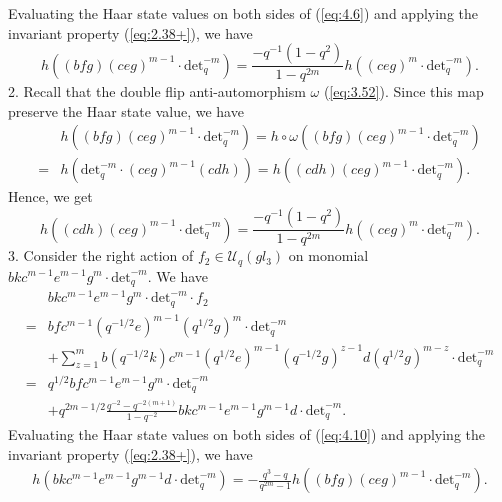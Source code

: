 \documentclass[table,a4paper,reqno]{amsart}
\numberwithin{equation}{section}
\theoremstyle{definition}
\begin{document}
Evaluating the Haar state values on both sides of (\ref{eq:4.6}) and applying the invariant property (\ref{eq:2.38+}), we have
\begin{equation}\label{eq:4.7}
    h((bfg)(ceg)^{m-1}\cdot\text{det}_q^{-m})=\frac{-q^{-1}(1-q^2)}{1-q^{2m}}h((ceg)^m\cdot\text{det}_q^{-m}).
\end{equation}
2. Recall that the double flip anti-automorphism $\omega$ (\ref{eq:3.52}). Since this map preserve the Haar state value, we have
\begin{equation}
\begin{split}
    &h((bfg)(ceg)^{m-1}\cdot\text{det}_q^{-m})=h\circ\omega((bfg)(ceg)^{m-1}\cdot\text{det}_q^{-m})\\
    =&h(\text{det}_q^{-m}\cdot(ceg)^{m-1}(cdh))=h((cdh)(ceg)^{m-1}\cdot\text{det}_q^{-m}).
\end{split}
\end{equation}
Hence, we get
\begin{equation}\label{eq:4.9}
    h((cdh)(ceg)^{m-1}\cdot\text{det}_q^{-m})=\frac{-q^{-1}(1-q^2)}{1-q^{2m}}h((ceg)^m\cdot\text{det}_q^{-m}).
\end{equation}
3. Consider the right action of $f_2\in\mathcal{U}_q(gl_3)$ on monomial $bkc^{m-1}e^{m-1}g^{m}\cdot\text{det}_q^{-m}$. We have 
\begin{equation}\label{eq:4.10}
    \begin{split}
        &bkc^{m-1}e^{m-1}g^{m}\cdot\text{det}_q^{-m}\cdot f_2\\
        =&bfc^{m-1}(q^{-1/2}e)^{m-1}(q^{1/2}g)^{m}\cdot\text{det}_q^{-m}\\
        &+\sum_{z=1}^mb(q^{-1/2}k)c^{m-1}(q^{1/2}e)^{m-1}(q^{-1/2}g)^{z-1}d(q^{1/2}g)^{m-z}\cdot\text{det}_q^{-m}\\
        =&q^{1/2}bfc^{m-1}e^{m-1}g^{m}\cdot\text{det}_q^{-m}\\
        &+q^{2m-1/2}\frac{q^{-2}-q^{-2(m+1)}}{1-q^{-2}}bkc^{m-1}e^{m-1}g^{m-1}d\cdot\text{det}_q^{-m}.
    \end{split}
\end{equation}
Evaluating the Haar state values on both sides of (\ref{eq:4.10}) and applying the invariant property (\ref{eq:2.38+}), we have
\begin{equation}\label{eq:4.11}
    \begin{split}
        h(bkc^{m-1}e^{m-1}g^{m-1}d\cdot\text{det}_q^{-m})=-\frac{q^{3}-q}{q^{2m}-1}h((bfg)(ceg)^{m-1}\cdot\text{det}_q^{-m}).
    \end{split}
\end{equation}
\end{document}
